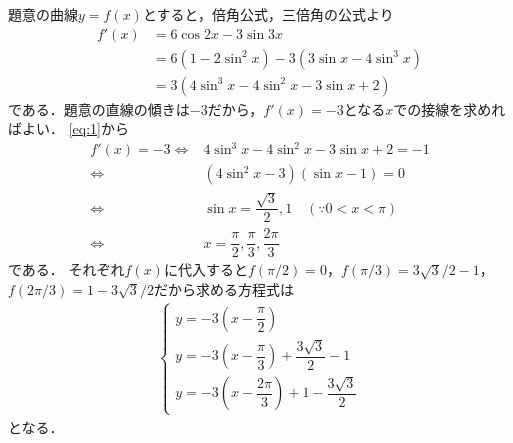 \documentclass[../../main.tex]{subfiles}
\begin{document}
題意の曲線$y=f(x)$とすると，倍角公式，三倍角の公式より
\begin{align}
  f'(x)&=6\cos 2x-3\sin 3x  \nonumber\\
  &=6(1-2\sin^2 x)-3(3\sin x-4\sin^3x)  \nonumber\\
  &=3(4\sin^3x-4\sin^2x-3\sin x+2) \label{eq:1}
\end{align}
である．題意の直線の傾きは$-3$だから，$f'(x)=-3$となる$x$での接線を求めればよい．
\cref{eq:1}から
\begin{align}
  f'(x)=-3
  \Longleftrightarrow
  & 4\sin^3x-4\sin^2x-3\sin x+2=-1 \\
  \Longleftrightarrow
  & (4\sin^2x-3)(\sin x-1)=0  \\
  \Longleftrightarrow
  &\sin x=\dfrac{\sqrt{3}}{2},1 \quad(\because 0<x<\pi)\\
  \Longleftrightarrow
  & x=\dfrac{\pi}{2},\dfrac{\pi}{3},\dfrac{2\pi}{3}
\end{align}
である．
それぞれ$f(x)$に代入すると$f(\pi/2)=0$，$f(\pi/3)=3\sqrt{3}/2-1$，$f(2\pi/3)=1-3\sqrt{3}/2$だから求める方程式は
\begin{align}
  \begin{cases}
    y=-3(x-\dfrac{\pi}{2})  \\
    y=-3(x-\dfrac{\pi}{3})+\dfrac{3\sqrt{3}}{2}-1  \\
    y=-3(x-\dfrac{2\pi}{3})+1-\dfrac{3\sqrt{3}}{2}
  \end{cases} \tag{答}
\end{align}
となる．
\newpage
\end{document}
